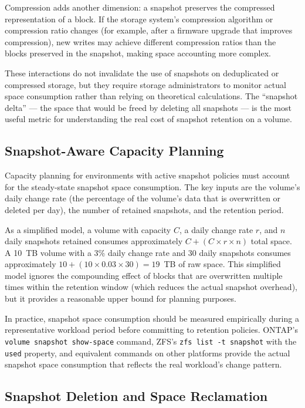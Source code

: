 Compression adds another dimension: a snapshot preserves the compressed representation of a block. If the storage system's compression algorithm or compression ratio changes (for example, after a firmware upgrade that improves compression), new writes may achieve different compression ratios than the blocks preserved in the snapshot, making space accounting more complex.

These interactions do not invalidate the use of snapshots on deduplicated or compressed storage, but they require storage administrators to monitor actual space consumption rather than relying on theoretical calculations. The ``snapshot delta'' --- the space that would be freed by deleting all snapshots --- is the most useful metric for understanding the real cost of snapshot retention on a volume.

\subsection{Snapshot-Aware Capacity Planning}

Capacity planning for environments with active snapshot policies must account for the steady-state snapshot space consumption. The key inputs are the volume's daily change rate (the percentage of the volume's data that is overwritten or deleted per day), the number of retained snapshots, and the retention period.

As a simplified model, a volume with capacity $C$, a daily change rate $r$, and $n$ daily snapshots retained consumes approximately $C + (C \times r \times n)$ total space. A 10~TB volume with a 3\% daily change rate and 30 daily snapshots consumes approximately $10 + (10 \times 0.03 \times 30) = 19$~TB of raw space. This simplified model ignores the compounding effect of blocks that are overwritten multiple times within the retention window (which reduces the actual snapshot overhead), but it provides a reasonable upper bound for planning purposes.

In practice, snapshot space consumption should be measured empirically during a representative workload period before committing to retention policies. ONTAP's \texttt{volume snapshot show-space} command, ZFS's \texttt{zfs list -t snapshot} with the \texttt{used} property, and equivalent commands on other platforms provide the actual snapshot space consumption that reflects the real workload's change pattern.

\subsection{Snapshot Deletion and Space Reclamation}

